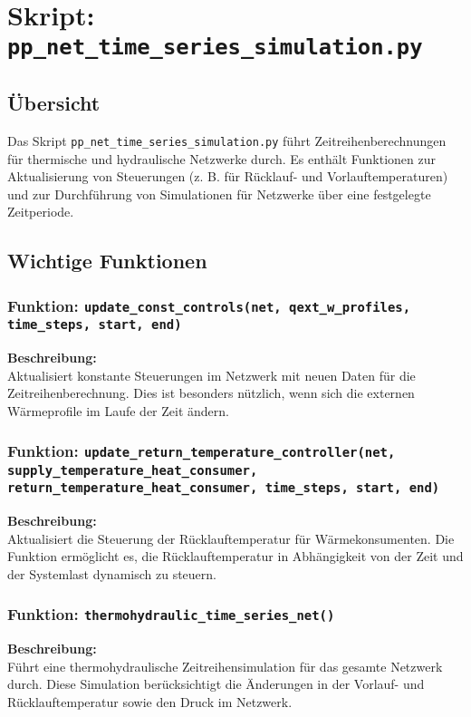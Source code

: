 \section{Skript: \texttt{pp\_net\_time\_series\_simulation.py}}

\subsection{Übersicht}
Das Skript \texttt{pp\_net\_time\_series\_simulation.py} führt Zeitreihenberechnungen für thermische und hydraulische Netzwerke durch. Es enthält Funktionen zur Aktualisierung von Steuerungen (z. B. für Rücklauf- und Vorlauftemperaturen) und zur Durchführung von Simulationen für Netzwerke über eine festgelegte Zeitperiode.

\subsection{Wichtige Funktionen}

\subsubsection{Funktion: \texttt{update\_const\_controls(net, qext\_w\_profiles, time\_steps, start, end)}}
\textbf{Beschreibung:}\\
Aktualisiert konstante Steuerungen im Netzwerk mit neuen Daten für die Zeitreihenberechnung. Dies ist besonders nützlich, wenn sich die externen Wärmeprofile im Laufe der Zeit ändern.

\subsubsection{Funktion: \texttt{update\_return\_temperature\_controller(net, supply\_temperature\_heat\_consumer, return\_temperature\_heat\_consumer, time\_steps, start, end)}}
\textbf{Beschreibung:}\\
Aktualisiert die Steuerung der Rücklauftemperatur für Wärmekonsumenten. Die Funktion ermöglicht es, die Rücklauftemperatur in Abhängigkeit von der Zeit und der Systemlast dynamisch zu steuern.

\subsubsection{Funktion: \texttt{thermohydraulic\_time\_series\_net()}}
\textbf{Beschreibung:}\\
Führt eine thermohydraulische Zeitreihensimulation für das gesamte Netzwerk durch. Diese Simulation berücksichtigt die Änderungen in der Vorlauf- und Rücklauftemperatur sowie den Druck im Netzwerk.

